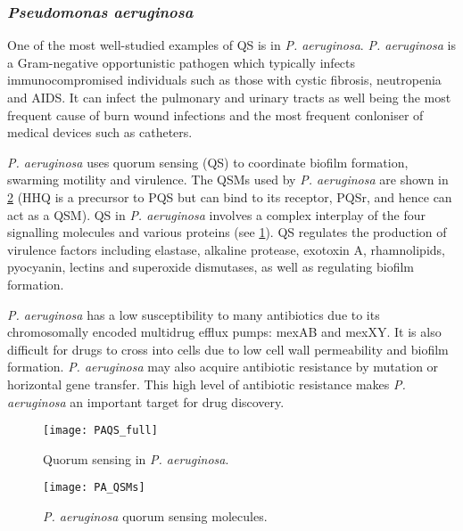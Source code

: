 \subsubsection{\textit{Pseudomonas aeruginosa}\label{sec:PAQSMs}}

One of the most well-studied examples of QS is in \textit{P. aeruginosa}.
\textit{P. aeruginosa} is a Gram-negative opportunistic pathogen which typically infects immunocompromised individuals such as those with cystic fibrosis, neutropenia and AIDS. It can infect the pulmonary and urinary tracts as well being the most frequent cause of burn wound infections and the most frequent conloniser of medical devices such as catheters\cite{Bodey1983}.

\textit{P. aeruginosa} uses quorum sensing (QS) to coordinate biofilm formation, swarming motility and virulence. The QSMs used by \textit{P. aeruginosa} are shown in \ref{fgr:PA_QSMs} (HHQ  is a precursor to PQS  but can bind to its receptor, PQSr, and hence can act as a QSM\cite{Xiao2006}). QS in \textit{P. aeruginosa} involves a complex interplay of the four signalling molecules and various proteins (see \ref{fgr:PA_QS})\cite{Dubern2008}. QS regulates the production of virulence factors including elastase, alkaline protease, exotoxin A, rhamnolipids, pyocyanin, lectins and superoxide dismutases, as well as regulating biofilm formation.

\textit{P. aeruginosa} has a low susceptibility to many antibiotics due to its chromosomally encoded multidrug efflux pumps: mexAB and mexXY\cite{Poole2004}. It is also difficult for drugs to cross into cells due to low cell wall permeability and biofilm formation. \textit{P. aeruginosa} may also acquire antibiotic resistance by mutation or horizontal gene transfer\cite{cornelis2008pseudomonas}. This high level of antibiotic resistance makes \textit{P. aeruginosa} an important target for drug discovery.

\begin{figure}[H]
	\begin{center}
		\texttt{[image: PAQS\_full]}
		\caption{Quorum sensing in \textit{P. aeruginosa}\cite{Dubern2008}. \label{fgr:PA_QS}}
	\end{center}
\end{figure}


\begin{figure}[H]
	\begin{center}
		\texttt{[image: PA\_QSMs]}
		\caption{\textit{P. aeruginosa} quorum sensing molecules. \label{fgr:PA_QSMs}}
	\end{center}
\end{figure}





